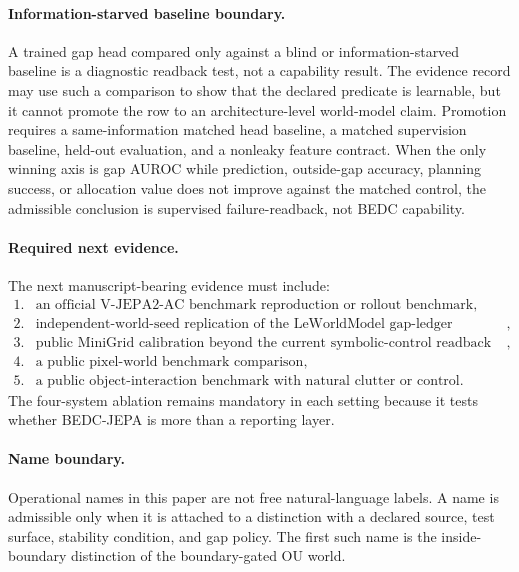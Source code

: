 \paragraph{Information-starved baseline boundary.}
A trained gap head compared only against a blind or information-starved
baseline is a diagnostic readback test, not a capability result.  The evidence
record may use such a comparison to show that the declared predicate is
learnable, but it cannot promote the row to an architecture-level world-model
claim.  Promotion requires a same-information matched head baseline, a matched
supervision baseline, held-out evaluation, and a nonleaky feature contract.
When the only winning axis is gap AUROC while prediction, outside-gap accuracy,
planning success, or allocation value does not improve against the matched
control, the admissible conclusion is supervised failure-readback, not BEDC
capability.

\paragraph{Required next evidence.}
The next manuscript-bearing evidence must include:
$$
\begin{array}{ll}
1. & \text{an official V-JEPA2-AC benchmark reproduction or rollout benchmark},\\
2. & \text{independent-world-seed replication of the LeWorldModel gap-ledger instantiation},\\
3. & \text{public MiniGrid calibration beyond the current symbolic-control readback scope},\\
4. & \text{a public pixel-world benchmark comparison},\\
5. & \text{a public object-interaction benchmark with natural clutter or control}.
\end{array}
$$
The four-system ablation remains mandatory in each setting because it tests
whether BEDC-JEPA is more than a reporting layer.

\paragraph{Name boundary.}
Operational names in this paper are not free natural-language labels.  A name
is admissible only when it is attached to a distinction with a declared source,
test surface, stability condition, and gap policy.  The first such name is the
inside-boundary distinction of the boundary-gated OU world.
